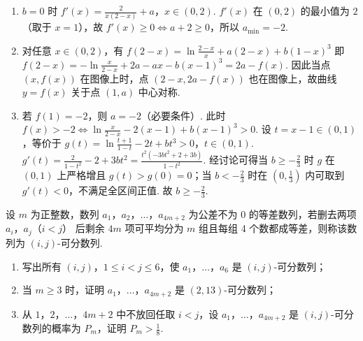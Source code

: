 \begin{solution}
\begin{enumerate}
\item \(b=0\) 时
\(f'(x)=\frac{2}{x(2-x)}+a\)，\(x\in(0,2)\).
\(f'(x)\) 在 \((0,2)\) 的最小值为 \(2\)（取于 \(x=1\)），故 \(f'(x)\ge0\iff a+2\ge0\)，所以 \(a_{\min}=-2\).

\item 对任意 \(x\in(0,2)\)，有
\(f(2-x)=\ln\frac{2-x}{x}+a(2-x)+b(1-x)^3\)
即
\(f(2-x)=-\ln\frac{x}{2-x}+2a-ax-b(x-1)^3=2a-f(x)\).
因此当点 \((x,f(x))\) 在图像上时，点 \((2-x,2a-f(x))\) 也在图像上，故曲线 \(y=f(x)\) 关于点 \((1,a)\) 中心对称.

\item 若 \(f(1)=-2\)，则 \(a=-2\)（必要条件）. 此时
\(f(x)>-2\iff \ln\frac{x}{2-x}-2(x-1)+b(x-1)^3>0\).
设 \(t=x-1\in(0,1)\)，等价于
\(g(t)=\ln\frac{t+1}{1-t}-2t+bt^3>0\)，\(t\in(0,1)\).
\(g'(t)=\frac{2}{1-t^2}-2+3bt^2=\frac{t^2(-3bt^2+2+3b)}{1-t^2}\).
经讨论可得当 \(b\ge-\frac23\) 时 \(g\) 在 \((0,1)\) 上严格增且 \(g(t)>g(0)=0\)；当 \(b<-\frac23\) 时在 \((0,\frac13)\) 内可取到 \(g'(t)<0\)，不满足全区间正值. 故
\(b\ge-\frac23\).
\end{enumerate}
\end{solution}

\begin{problem}
设 \(m\) 为正整数，数列 \(a_1\)，\(a_2\)，\(\dots\)，\(a_{4m+2}\) 为公差不为 \(0\) 的等差数列，若删去两项 \(a_i\)，\(a_j\)（\(i<j\)） 后剩余 \(4m\) 项可平均分为 \(m\) 组且每组 4 个数都成等差，则称该数列为 \((i,j)\)-可分数列.
\begin{enumerate}
\item 写出所有 \((i,j)\)，\(1\le i<j\le6\)，使 \(a_1\)，\(\dots\)，\(a_6\) 是 \((i,j)\)-可分数列；
\item 当 \(m\ge3\) 时，证明 \(a_1\)，\(\dots\)，\(a_{4m+2}\) 是 \((2,13)\)-可分数列；
\item 从 \(1\)，\(2\)，\(\dots\)，\(4m+2\) 中不放回任取 \(i<j\)，设 \(a_1\)，\(\dots\)，\(a_{4m+2}\) 是 \((i,j)\)-可分数列的概率为 \(P_m\)，证明 \(P_m>\frac18\).
\end{enumerate}
\end{problem}

